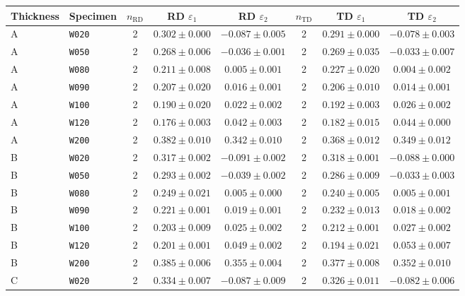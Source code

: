 \begin{table}
    \centering
    \scriptsize
    \setlength{\tabcolsep}{4pt}
    \begin{tabular}{llcccccc}
        \toprule
        Thickness & Specimen &
        $n_{\mathrm{RD}}$ & RD $\varepsilon_1$ & RD $\varepsilon_2$ &
        $n_{\mathrm{TD}}$ & TD $\varepsilon_1$ & TD $\varepsilon_2$ \\
        \midrule
        A & \texttt{W020} &2 & $0.302\pm0.000$ & $-0.087\pm0.005$ & 2 & $0.291\pm0.000$ & $-0.078\pm0.003$ \\
        A & \texttt{W050} &2 & $0.268\pm0.006$ & $-0.036\pm0.001$ & 2 & $0.269\pm0.035$ & $-0.033\pm0.007$ \\
        A & \texttt{W080} &2 & $0.211\pm0.008$ & $0.005\pm0.001$ & 2 & $0.227\pm0.020$ & $0.004\pm0.002$ \\
        A & \texttt{W090} &2 & $0.207\pm0.020$ & $0.016\pm0.001$ & 2 & $0.206\pm0.010$ & $0.014\pm0.001$ \\
        A & \texttt{W100} &2 & $0.190\pm0.020$ & $0.022\pm0.002$ & 2 & $0.192\pm0.003$ & $0.026\pm0.002$ \\
        A & \texttt{W120} &2 & $0.176\pm0.003$ & $0.042\pm0.003$ & 2 & $0.182\pm0.015$ & $0.044\pm0.000$ \\
        A & \texttt{W200} &2 & $0.382\pm0.010$ & $0.342\pm0.010$ & 2 & $0.368\pm0.012$ & $0.349\pm0.012$ \\
        \midrule
        B & \texttt{W020} &2 & $0.317\pm0.002$ & $-0.091\pm0.002$ & 2 & $0.318\pm0.001$ & $-0.088\pm0.000$ \\
        B & \texttt{W050} &2 & $0.293\pm0.002$ & $-0.039\pm0.002$ & 2 & $0.286\pm0.009$ & $-0.033\pm0.003$ \\
        B & \texttt{W080} &2 & $0.249\pm0.021$ & $0.005\pm0.000$ & 2 & $0.240\pm0.005$ & $0.005\pm0.001$ \\
        B & \texttt{W090} &2 & $0.221\pm0.001$ & $0.019\pm0.001$ & 2 & $0.232\pm0.013$ & $0.018\pm0.002$ \\
        B & \texttt{W100} &2 & $0.203\pm0.009$ & $0.025\pm0.002$ & 2 & $0.212\pm0.001$ & $0.027\pm0.002$ \\
        B & \texttt{W120} &2 & $0.201\pm0.001$ & $0.049\pm0.002$ & 2 & $0.194\pm0.021$ & $0.053\pm0.007$ \\
        B & \texttt{W200} &2 & $0.385\pm0.006$ & $0.355\pm0.004$ & 2 & $0.377\pm0.008$ & $0.352\pm0.010$ \\
        \midrule
        C & \texttt{W020} &2 & $0.334\pm0.007$ & $-0.087\pm0.009$ & 2 & $0.326\pm0.011$ & $-0.082\pm0.006$ \\

\end{tabular}
\end{table}
